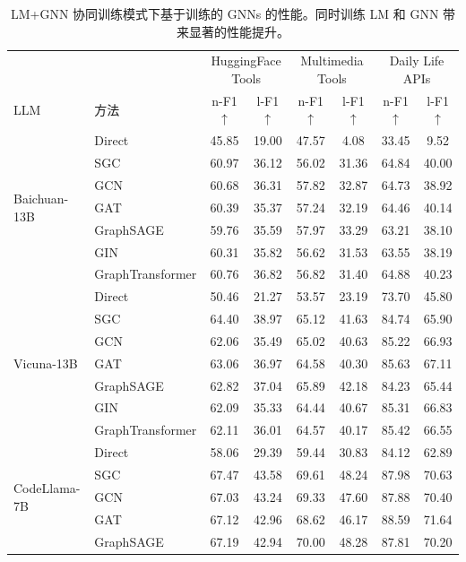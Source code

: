 \documentclass[11pt,UTF8,fontset=fandol]{ctexart}
\begin{document}
\begin{table}[H]\centering
\caption{LM+GNN 协同训练模式下基于训练的 GNNs 的性能。同时训练 LM 和 GNN 带来显著的性能提升。}
\label{tab:12}
\scriptsize
\setlength{\tabcolsep}{4pt}
\begin{tabular}{llcc cc cc}
\toprule
& & \multicolumn{2}{c}{HuggingFace Tools} & \multicolumn{2}{c}{Multimedia Tools} & \multicolumn{2}{c}{Daily Life APIs}\\
\cmidrule(lr){3-4}\cmidrule(lr){5-6}\cmidrule(lr){7-8}
LLM & 方法 & n-F1$\uparrow$ & l-F1$\uparrow$ & n-F1$\uparrow$ & l-F1$\uparrow$ & n-F1$\uparrow$ & l-F1$\uparrow$\\
\midrule
\multirow{7}{*}{Baichuan-13B}
& Direct & 45.85 & 19.00 & 47.57 & 4.08 & 33.45 & 9.52\\
& SGC & 60.97 & 36.12 & 56.02 & 31.36 & 64.84 & 40.00\\
& GCN & 60.68 & 36.31 & 57.82 & 32.87 & 64.73 & 38.92\\
& GAT & 60.39 & 35.37 & 57.24 & 32.19 & 64.46 & 40.14\\
& GraphSAGE & 59.76 & 35.59 & 57.97 & 33.29 & 63.21 & 38.10\\
& GIN & 60.31 & 35.82 & 56.62 & 31.53 & 63.55 & 38.19\\
& GraphTransformer & 60.76 & 36.82 & 56.82 & 31.40 & 64.88 & 40.23\\
\midrule
\multirow{7}{*}{Vicuna-13B}
& Direct & 50.46 & 21.27 & 53.57 & 23.19 & 73.70 & 45.80\\
& SGC & 64.40 & 38.97 & 65.12 & 41.63 & 84.74 & 65.90\\
& GCN & 62.06 & 35.49 & 65.02 & 40.63 & 85.22 & 66.93\\
& GAT & 63.06 & 36.97 & 64.58 & 40.30 & 85.63 & 67.11\\
& GraphSAGE & 62.82 & 37.04 & 65.89 & 42.18 & 84.23 & 65.44\\
& GIN & 62.09 & 35.33 & 64.44 & 40.67 & 85.31 & 66.83\\
& GraphTransformer & 62.11 & 36.01 & 64.57 & 40.17 & 85.42 & 66.55\\
\midrule
\multirow{7}{*}{CodeLlama-7B}
& Direct & 58.06 & 29.39 & 59.44 & 30.83 & 84.12 & 62.89\\
& SGC & 67.47 & 43.58 & 69.61 & 48.24 & 87.98 & 70.63\\
& GCN & 67.03 & 43.24 & 69.33 & 47.60 & 87.88 & 70.40\\
& GAT & 67.12 & 42.96 & 68.62 & 46.17 & 88.59 & 71.64\\
& GraphSAGE & 67.19 & 42.94 & 70.00 & 48.28 & 87.81 & 70.20\\

\end{tabular}
\end{table}
\end{document}

